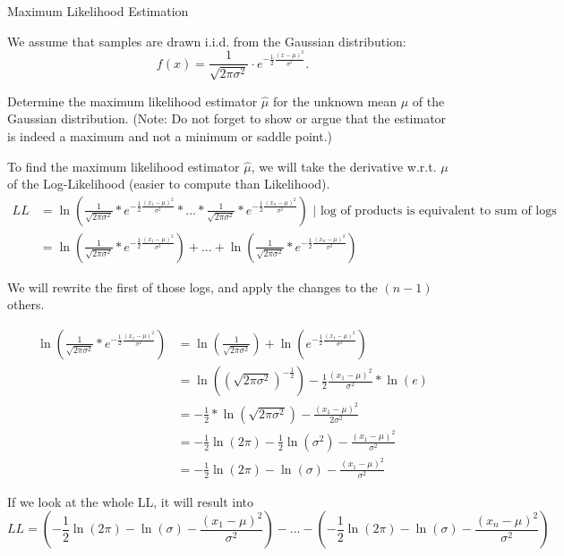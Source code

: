 \documentclass[
	english,
        solution=true
	]{tudaexercise}
\begin{document}
\begin{task}[points=20]{Maximum Likelihood Estimation}

We assume that samples are drawn i.i.d. from the Gaussian distribution: \\
\[f(x) = \frac{1}{\sqrt{2 \pi \sigma^{2}}} \cdot e^{-\frac{1}{2}\frac{(x - \mu)^{2}}{\sigma^{^2}}}.\]

\begin{subtask}[points=7]
Determine the maximum likelihood estimator $\hat{\mu}$ for the unknown mean $\mu$ of the Gaussian distribution. (Note: Do not forget to show or argue that the estimator is indeed a maximum and not a minimum or saddle point.)\\

\begin{solution}

To find the maximum likelihood estimator $\hat{\mu}$, we will take the derivative w.r.t. $\mu$ of the Log-Likelihood (easier to compute than Likelihood). 
\begin{align*}
    LL &= \ln(\frac{1}{\sqrt{2\pi\sigma^2}}*e^{-\frac{1}{2} \frac{(x_1 - \mu)^2}{\sigma^2}} * ... * \frac{1}{\sqrt{2\pi\sigma^2}}*e^{-\frac{1}{2} \frac{(x_n - \mu)^2}{\sigma^2}}) \text{ | log of products is equivalent to sum of logs}\\
    &= \ln(\frac{1}{\sqrt{2\pi\sigma^2}}*e^{-\frac{1}{2} \frac{(x_1 - \mu)^2}{\sigma^2}})+...+\ln(\frac{1}{\sqrt{2\pi\sigma^2}}*e^{-\frac{1}{2} \frac{(x_n - \mu)^2}{\sigma^2}})
\end{align*}

We will rewrite the first of those logs, and apply the changes to the $(n-1)$ others.

\begin{align*}
    \ln(\frac{1}{\sqrt{2\pi\sigma^2}}*e^{-\frac{1}{2} \frac{(x_1 - \mu)^2}{\sigma^2}}) &= \ln(\frac{1}{\sqrt{2\pi \sigma^2}})+\ln(e^{-\frac{1}{2} \frac{(x_1-\mu)^2}{\sigma^2}}) \\
    &= \ln((\sqrt{2 \pi \sigma^2})^{-\frac{1}{2}})-\frac{1}{2} \frac{(x_1 - \mu)^2}{\sigma^2}*\ln(e) \\
    &= -\frac{1}{2} *\ln(\sqrt{2\pi \sigma^2})-\frac{(x_1-\mu)^2}{2\sigma^2} \\
    &= -\frac{1}{2} \ln(2\pi) - \frac{1}{2} \ln(\sigma^2)-\frac{(x_1-\mu)^2}{\sigma^2} \\
    &= -\frac{1}{2} \ln(2\pi) - \ln(\sigma)-\frac{(x_1-\mu)^2}{\sigma^2}
\end{align*}

If we look at the whole LL, it will result into
\[LL=(-\frac{1}{2} \ln(2\pi) - \ln(\sigma)-\frac{(x_1-\mu)^2}{\sigma^2})-...-(-\frac{1}{2} \ln(2\pi) - \ln(\sigma)-\frac{(x_n-\mu)^2}{\sigma^2})\]


\end{solution}
\end{subtask}
\end{task}
\end{document}
